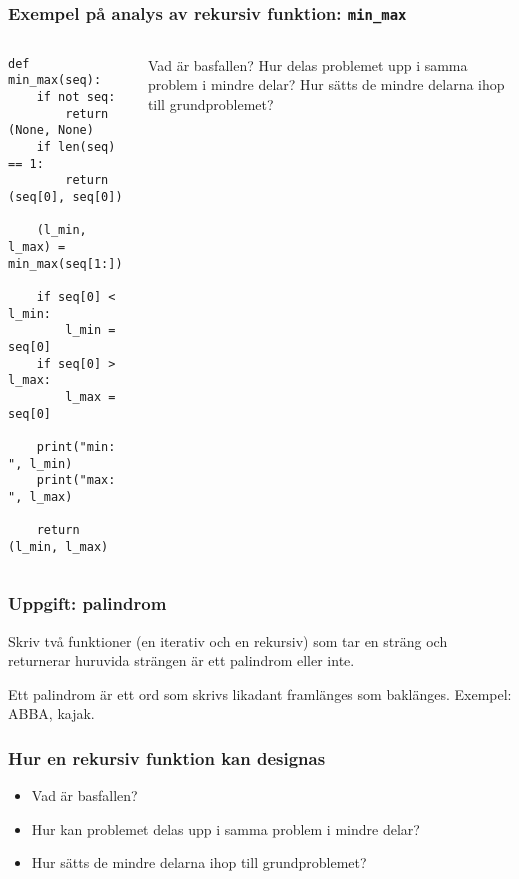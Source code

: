 \documentclass{beamer}
\begin{document}
  \begin{frame}[fragile]
    \frametitle{Exempel på analys av rekursiv funktion: \texttt{min\_max}}

    \begin{columns}
      \begin{column}{0.48\textwidth}
        \begin{verbatim}
def min_max(seq):
    if not seq:
        return (None, None)
    if len(seq) == 1:
        return (seq[0], seq[0])

    (l_min, l_max) = min_max(seq[1:])

    if seq[0] < l_min:
        l_min = seq[0]
    if seq[0] > l_max:
        l_max = seq[0]

    print("min: ", l_min)
    print("max: ", l_max)

    return (l_min, l_max)
        \end{verbatim}

      \end{column}%
      \begin{column}{0.48\textwidth}
         {Vad är basfallen?}%
         {Hur delas problemet upp i samma problem i mindre delar?}%
         {Hur sätts de mindre delarna ihop till grundproblemet?}%
      \end{column}
    \end{columns}

  \end{frame}

  \begin{frame}[fragile]
    \frametitle{Uppgift: palindrom}

    Skriv två funktioner (en iterativ och en rekursiv) som tar en sträng och
    returnerar huruvida strängen är ett palindrom eller inte.

    Ett palindrom är ett ord som skrivs likadant framlänges som baklänges.
    Exempel: ABBA, kajak.

  \end{frame}

  \begin{frame}
    \frametitle{Hur en rekursiv funktion kan designas}

    \begin{itemize}
      \item Vad är basfallen?
      \item Hur kan problemet delas upp i samma problem i mindre delar?
      \item Hur sätts de mindre delarna ihop till grundproblemet?
    \end{itemize}
  \end{frame}
\end{document}
